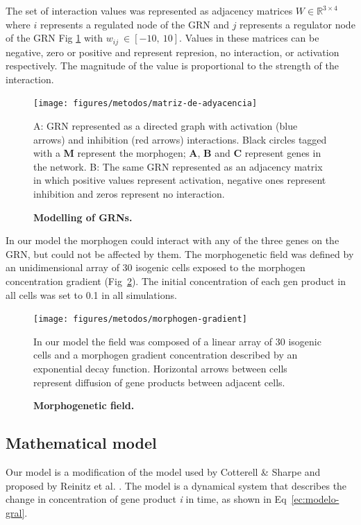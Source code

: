 \documentclass[10pt,letterpaper]{article}
\begin{document}
The set of interaction values was represented as adjacency matrices $W \in 
\mathbb{R}^{3\times4}$ where $i$ represents a regulated node of the GRN and $j$ 
represents a regulator node of the GRN Fig \ref{fig:adjmat} with 
$w_{\textit{ij}}~\in [-10,\ 10]$. Values in these matrices can be negative, zero
or positive and represent represion, no interaction, or activation respectively.
The magnitude of the value is proportional to the strength of the interaction.\\

\begin{figure}[!h]
 \texttt{[image: figures/metodos/matriz-de-adyacencia]}
    \caption{\bf Modelling of GRNs.}
    A: GRN represented as a directed graph with activation (blue arrows) and 
    inhibition (red arrows) interactions. Black circles
    tagged with a \textbf{M} represent the morphogen; \textbf{A}, \textbf{B} and
    \textbf{C} represent genes in the network.
    B: The same GRN represented as an adjacency matrix in which positive values 
    represent activation, negative ones represent inhibition and
    zeros represent no interaction.
 \label{fig:adjmat}
\end{figure}

In our model the morphogen could interact with any of the three genes on the 
GRN, but could not be affected by them. The morphogenetic field was defined by 
an unidimensional array of 30 isogenic cells exposed to the morphogen 
concentration gradient (Fig~\ref{fig:morfgrad}). The initial concentration of 
each gen product in all cells was set to 0.1 in all simulations.\\

\begin{figure}[!h]
 \texttt{[image: figures/metodos/morphogen-gradient]}
 \caption{\bf Morphogenetic field.}
 In our model the field was composed of a linear array of 30 isogenic cells and 
 a morphogen gradient concentration described by an exponential decay function. 
 Horizontal arrows between cells represent diffusion of gene products between 
 adjacent cells.
 \label{fig:morfgrad}
\end{figure}

\subsection*{Mathematical model}

Our model is a modification of the model used by Cotterell \& Sharpe 
\cite{Cotterell2010} and proposed by Reinitz et al. \cite{Reinitz1995}. The 
model is a dynamical system that describes the change in concentration of gene 
product \emph{i} in time, as shown in Eq~\ref{ec:modelo-gral}.
\end{document}
